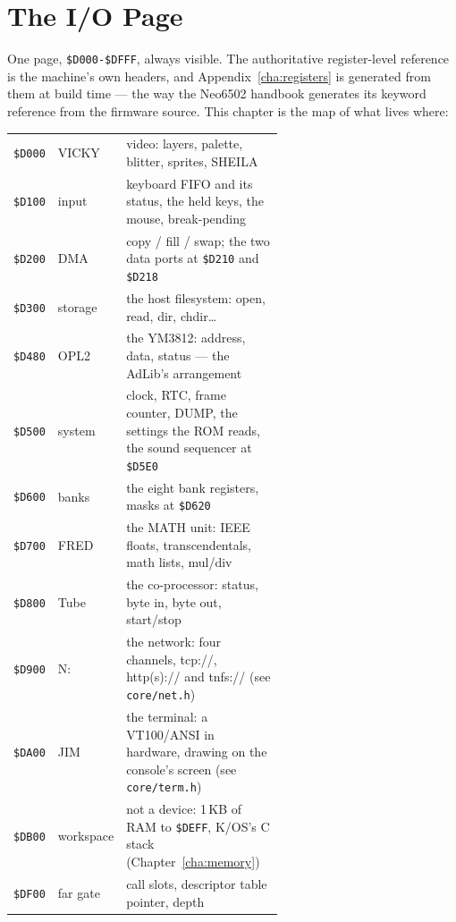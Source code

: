 \chapter{The I/O Page}\label{cha:io}

One page, \texttt{\$D000-\$DFFF}, always visible. The authoritative
register-level reference is the machine's own headers, and
Appendix~\ref{cha:registers} is generated from them at build time --- the
way the Neo6502 handbook generates its keyword reference from the
firmware source. This chapter is the map of what lives where:

\begin{center}
\small
\begin{tabular}{@{}l l >{\raggedright\arraybackslash}p{0.60\linewidth}@{}}
\toprule
\texttt{\$D000} & VICKY   & video: layers, palette, blitter, sprites, SHEILA\\
\texttt{\$D100} & input   & keyboard FIFO and its status, the held keys, the mouse, break-pending\\
\texttt{\$D200} & DMA     & copy / fill / swap; the two data ports at \texttt{\$D210} and \texttt{\$D218}\\
\texttt{\$D300} & storage & the host filesystem: open, read, dir, chdir\ldots\\
\texttt{\$D480} & OPL2    & the YM3812: address, data, status --- the AdLib's arrangement\\
\texttt{\$D500} & system  & clock, RTC, frame counter, DUMP, the settings the ROM reads, the sound sequencer at \texttt{\$D5E0}\\
\texttt{\$D600} & banks   & the eight bank registers, masks at \texttt{\$D620}\\
\texttt{\$D700} & FRED    & the MATH unit: IEEE floats, transcendentals, math lists, mul/div\\
\texttt{\$D800} & Tube    & the co-processor: status, byte in, byte out, start/stop\\
\texttt{\$D900} & N:      & the network: four channels, tcp://, http(s):// and tnfs:// (see \texttt{core/net.h})\\
\texttt{\$DA00} & JIM     & the terminal: a VT100/ANSI in hardware, drawing on the console's screen (see \texttt{core/term.h})\\
\texttt{\$DB00} & workspace & not a device: 1\,KB of RAM to \texttt{\$DEFF}, K/OS's C stack (Chapter~\ref{cha:memory})\\
\texttt{\$DF00} & far gate& call slots, descriptor table pointer, depth\\
\bottomrule
\end{tabular}
\end{center}

